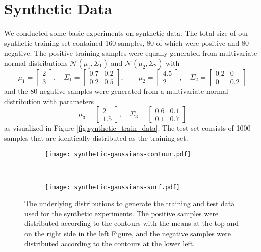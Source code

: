 \section{Synthetic Data}
We conducted some basic experiments on synthetic data. 
The total size of our synthetic training set contained 160 samples, 80 of which were positive and 80 negative. 
The positive training samples were equally generated from multivariate normal distributions $\mathcal{N}(\mu_1,\Sigma_1)$ and $\mathcal{N}(\mu_2, \Sigma_2)$ with 
$$\mu_1= \begin{bmatrix}2 \\ 3 \end{bmatrix}, \quad \Sigma_1 = \begin{bmatrix}0.7 & 0.2 \\ 0.2 & 0.5 \end{bmatrix}, \qquad \mu_2 = \begin{bmatrix}4.5 \\ 2 \end{bmatrix}, \quad \Sigma_2 = \begin{bmatrix} 0.2 & 0 \\ 0 & 0.2 \end{bmatrix}$$
and the 80 negative samples were generated from a multivariate normal distribution with parameters 
$$\mu_3 = \begin{bmatrix} 2\\1.5\end{bmatrix}, \quad \Sigma_3 = \begin{bmatrix}0.6 & 0.1\\ 0.1 & 0.7\end{bmatrix}$$
as visualized in Figure \ref{fig:synthetic_train_data}. The test set consists of 1000 samples that are identically distributed as the training set.
\begin{figure}[ht]
	\centering
	\begin{subfigure}[h]{0.45\textwidth}
	\texttt{[image: synthetic-gaussians-contour.pdf]}	
	\end{subfigure}
	~
	\begin{subfigure}[h]{0.45\textwidth}
	\texttt{[image: synthetic-gaussians-surf.pdf]}	
	\end{subfigure}
	\caption{The underlying distributions to generate the training and test data used for the synthetic experiments. The positive samples were distributed according to the contours with the means at the top and on the right side in the left Figure, and the negative samples were distributed according to the contours at the lower left.}
	\label{fig:synthetic-gaussians}
\end{figure}

